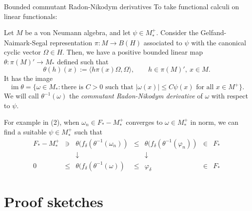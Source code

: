 \documentclass{../../../../slide}
\begin{document}
\begin{frame}{Bounded commutant Radon-Nikodym derivatives}
To take functional calculi on linear functionals:
\pause
\begin{defn}
Let $M$ be a von Neumann algebra, and let $\psi\in M_*^+$.
Consider the Gelfand-Naimark-Segal representation $\pi:M\to B(H)$ associated to $\psi$ with the canonical cyclic vector $\Omega\in H$.
Then, we have a positive bounded linear map $\theta:\pi(M)'\to M_*$ defined such that
\[\theta(h)(x):=\langle h\pi(x)\Omega,\Omega\rangle,\qquad h\in\pi(M)',\ x\in M.\]
It has the image
\[\operatorname{im}\theta=\{\omega\in M_*:\text{there is $C>0$ such that $|\omega(x)|\le C\psi(x)$ for all $x\in M^+$}\}.\]
We will call $\theta^{-1}(\omega)$ the \emph{commutant Radon-Nikodym derivative} of $\omega$ with respect to $\psi$.
\end{defn}
\pause
For example in (2), when $\omega_n\in F_*-M_*^+$ converges to $\omega\in M_*^+$ in norm, we can find a suitable $\psi\in M_*^+$ such that
\[\begin{array}{ccccccc}
F_*-M_*^+ & \ni & \theta(f_\delta(\theta^{-1}(\omega_n)) & \le & \theta(f_\delta(\theta^{-1}(\varphi_n)) & \in & F_* \\
&& \downarrow && \downarrow &&\\
0 & \le & \theta(f_\delta(\theta^{-1}(\omega)) & \le & \varphi_\delta & \in & F_*
\end{array}\]
\end{frame}

\section{Proof sketches}
\contents
\end{document}

